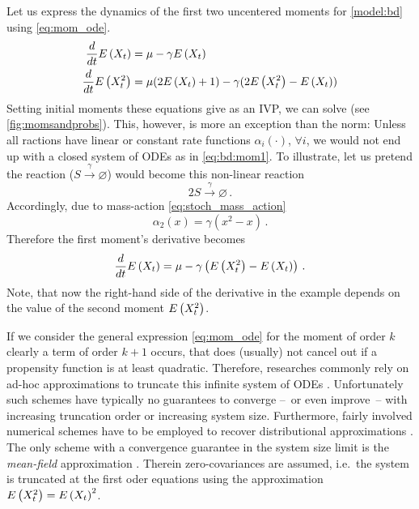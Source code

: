 \begin{example} Let us express the dynamics of the first two uncentered moments for \autoref{model:bd} using \eqref{eq:mom_ode}.
\begin{equation}\label{eq:bd:mom1}
	\begin{split}
	\frac{d}{dt}\E{X_t} =\; &\mu - \gamma \E{X_t}\\
	\frac{d}{dt}\E{X_t^2} =\; &\mu(2\E{X_t} + 1) - \gamma (2\E{X_t^2}-\E{X_t})%
	\end{split}
\end{equation}
Setting initial moments these equations give as an \ac{IVP}, we can solve (see \autoref{fig:momsandprobs}).
This, however, is more an exception than the norm:
Unless all ractions have linear or constant rate functions $\alpha_i(\cdot)$, $\forall i$, we would not end up with a closed system of \acp{ODE} as in \eqref{eq:bd:mom1}.
To illustrate, let us pretend the reaction ($S\xrightarrow{\gamma}\varnothing$) would become this non-linear reaction
	\[
2S\xrightarrow{\gamma}\varnothing\,.
\]
Accordingly, due to mass-action \eqref{eq:stoch_mass_action}
	\[
\alpha_2(x)=\gamma (x^2 - x)\,.
\]
Therefore the first moment's derivative becomes
	\[
\frac{d}{dt}{E}\left(X_t\right) =\mu - \gamma \left({E}\left(X_t^2\right) - {E}\left(X_t\right)\right)\,.
\]
Note, that now the right-hand side of the derivative in the example depends on the value of the second moment ${E}\left(X_t^2\right)$.
\end{example}
If we consider the general expression \eqref{eq:mom_ode} for the moment of order $k$ clearly a term of order $k+1$ occurs, that does (usually) not cancel out if a propensity function is at least
quadratic.
Therefore, researches commonly rely on ad-hoc approximations to truncate this infinite system of \acp{ODE} \cite{hespanha2008moment,schnoerr2015,schnoerr2014validity}.
Unfortunately such schemes have typically no guarantees to converge --~or even improve~-- with increasing truncation order \cite{schnoerr2014validity} or increasing system size.
Furthermore,
fairly involved numerical schemes have to be employed to recover distributional approximations \cite{andreychenko2017distribution}.
The only scheme with a convergence guarantee in the system size limit is the \emph{mean-field} approximation \cite{bortolussi2013continuous}.
Therein zero-covariances are assumed, i.e.\ the system is truncated at the first oder equations using the approximation ${E}\left(X_t^2\right)={E}\left(X_t\right)^2$.
